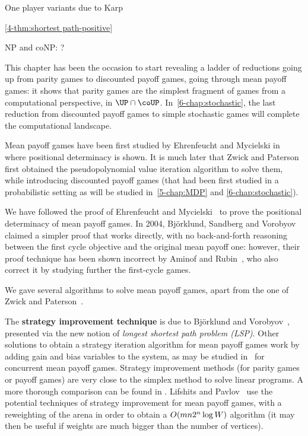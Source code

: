 One player variants due to Karp~\cite{Karp:1978}

\cref{4-thm:shortest path-positive}
\cite{Khachiyan&al:2008}

NP and coNP: \cite{Puri:1995}?

This chapter has been the occasion to start revealing a ladder of
reductions going up from parity games to discounted payoff games,
going through mean payoff games: it shows that parity games are the
simplest fragment of games from a computational perspective, in
$\UP\cap \coUP$. In~\cref{6-chap:stochastic}, the last reduction from
discounted payoff games to simple stochastic games will complete the
computational landscape.

Mean payoff games have been first studied by Ehrenfeucht and Mycielski
in~\cite{Ehrebfeucht&Mycielski:1979} where positional determinacy is
shown. It is much later that Zwick and
Paterson~\cite{Zwick&Paterson:1996} first obtained the
pseudopolynomial value iteration algorithm to solve them, while
introducing discounted payoff games (that had been first studied in a
probabilistic setting as will be studied in~\cref{5-chap:MDP} and
\cref{6-chap:stochastic}).

We have followed the proof of Ehrenfeucht and
Mycielski~\cite{Ehrebfeucht&Mycielski:1979} to prove the positional
determinacy of mean payoff games. In 2004, Bj\"orklund, Sandberg and
Vorobyov \cite{Bjorklund&Sandberg&Vorobyov:2004} claimed a simpler
proof that works directly, with no back-and-forth reasoning between
the first cycle objective and the original mean payoff one: however,
their proof technique has been shown incorrect by Aminof and
Rubin~\cite{Aminof&Rubin:2017}, who also correct it by studying
further the first-cycle games.

We gave several algorithms to solve mean payoff games, apart from the
one of Zwick and Paterson~\cite{Zwick&Paterson:1996}.

The \textbf{strategy improvement technique} is due to Bj\"orklund and
Vorobyov~\cite{Bjorklund&Vorobyov:2007}, presented via the new notion
of \emph{longest shortest path problem (LSP)}. Other solutions to
obtain a strategy iteration algorithm for mean payoff games work by
adding gain and bias variables to the system, as may be studied
in~\cite{Filar&Vrieze:1996} for concurrent mean payoff games.  Strategy
improvement methods (for parity games or payoff games) are very close
to the simplex method to solve linear programs. A more thorough
comparison can be found in \cite{Allamigeon&Benchimol&al:2014}.  Lifshits and
Pavlov~\cite{Lifshits&Pavlov:2007} use the potential techniques of strategy
improvement for mean payoff games, with a reweighting of the arena in
order to obtain a $O(mn2^{n}\log W)$ algorithm (it may
then be useful if weights are much bigger than the number of
vertices).

